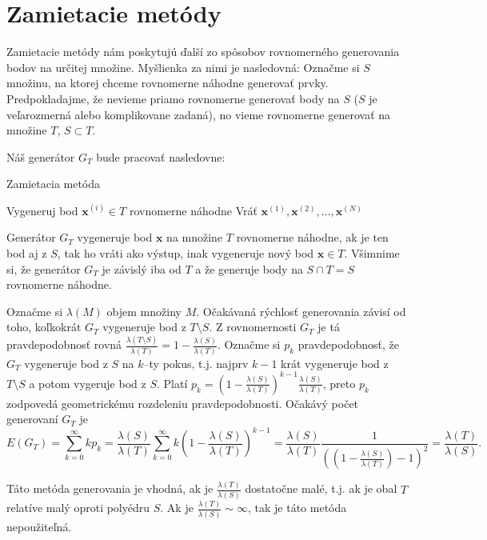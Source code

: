 \section{Zamietacie metódy}

Zamietacie metódy nám poskytujú ďalší zo spôsobov rovnomerného generovania bodov na určitej množine.
Myšlienka za nimi je nasledovná: Označme si $S$ množinu, na ktorej chceme rovnomerne náhodne generovať prvky. Predpokladajme, že nevieme priamo rovnomerne generovať body na $S$ ($S$ je veľarozmerná alebo komplikovane zadaná), no vieme rovnomerne generovať na množine $T$, $S \subset T$.

Náš generátor $G_T$ bude pracovať nasledovne:

\begin{algorithm}[H]
	\caption{Zamietacia metóda}
	\label{zamietanie:basic}
	\begin{algorithmic}[1]
			\Repeat
			\State Vygeneruj bod $\mathbf x^{(i)} \in T$ rovnomerne náhodne
		\EndFor
		\State Vráť ${\mathbf x^{(1)},\mathbf x^{(2)},\dots,\mathbf x^{(N)}}$
	\end{algorithmic}
\end{algorithm}
Generátor $G_T$ vygeneruje bod $\mathbf x$ na množine $T$ rovnomerne náhodne, ak je ten bod aj z $S$, tak ho vráti ako výstup, inak vygeneruje nový bod $\mathbf x \in T$. Všimnime si, že generátor $G_T$ je závislý iba od $T$ a že generuje body na $S \cap T=S$ rovnomerne náhodne.

Označme si $\lambda(M)$ objem množiny $M$. Očakávaná rýchlosť generovania závisí od toho, koľkokrát $G_T$ vygeneruje bod z $T \setminus S$. Z rovnomernosti $G_T$ je tá pravdepodobnosť rovná $\frac{\lambda(T \setminus S)}{\lambda(T)} = 1-\frac{\lambda(S)}{\lambda(T)}$. Označme si $p_k$ pravdepodobnosť, že $G_T$ vygeneruje bod z $S$ na $k$--ty pokus, t.j. najprv $k-1$ krát vygeneruje bod z $T \setminus S$ a potom vygeruje bod z $S$. Platí $p_k= (1-\frac{\lambda(S)}{\lambda(T)})^{k-1}\frac{\lambda(S)}{\lambda(T)}$, preto $p_k$ zodpovedá geometrickému rozdeleniu pravdepodobnosti. Očakávý počet generovaní $G_T$ je $$E(G_T)=\sum^{\infty}_{k=0}kp_k=\frac{\lambda(S)}{\lambda(T)} \sum^{\infty}_{k=0}k(1-\frac{\lambda(S)}{\lambda(T)})^{k-1}=\frac{\lambda(S)}{\lambda(T)} \frac{1}{((1-\frac{\lambda(S)}{\lambda(T)})-1)^2} = \frac{\lambda(T)}{\lambda(S)}.$$

Táto metóda generovania je vhodná, ak je $\frac{\lambda(T)}{\lambda(S)}$ dostatočne malé, t.j. ak je obal $T$ relatíve malý oproti polyédru $S$. Ak je $\frac{\lambda(T)}{\lambda(S)} \sim \infty$, tak je táto metóda nepoužiteľná.\\


